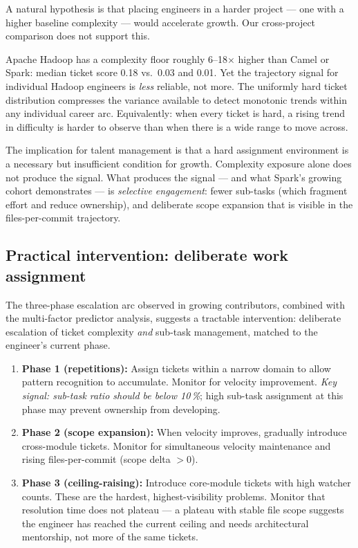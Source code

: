\documentclass[12pt,a4paper]{article}
\begin{document}
A natural hypothesis is that placing engineers in a harder project
--- one with a higher baseline complexity --- would accelerate growth.
Our cross-project comparison does not support this.

Apache Hadoop has a complexity floor roughly 6--18$\times$ higher
than Camel or Spark: median ticket score 0.18 vs.\ 0.03 and 0.01.
Yet the trajectory signal for individual Hadoop engineers is
\textit{less} reliable, not more.
The uniformly hard ticket distribution compresses the variance available
to detect monotonic trends within any individual career arc.
Equivalently: when every ticket is hard, a rising trend in difficulty
is harder to observe than when there is a wide range to move across.

The implication for talent management is that a hard assignment
environment is a necessary but insufficient condition for growth.
Complexity exposure alone does not produce the signal.
What produces the signal --- and what Spark's growing cohort
demonstrates --- is \textit{selective engagement}: fewer sub-tasks
(which fragment effort and reduce ownership), and deliberate scope
expansion that is visible in the files-per-commit trajectory.

\subsection{Practical intervention: deliberate work assignment}

The three-phase escalation arc observed in growing contributors,
combined with the multi-factor predictor analysis, suggests a
tractable intervention: deliberate escalation of ticket complexity
\textit{and} sub-task management, matched to the engineer's current phase.

\begin{enumerate}
  \item \textbf{Phase 1 (repetitions):} Assign tickets within a
    narrow domain to allow pattern recognition to accumulate.
    Monitor for velocity improvement.
    \textit{Key signal: sub-task ratio should be below 10\,\%};
    high sub-task assignment at this phase may prevent ownership
    from developing.
  \item \textbf{Phase 2 (scope expansion):} When velocity improves,
    gradually introduce cross-module tickets.
    Monitor for simultaneous velocity maintenance and
    rising files-per-commit (scope delta $> 0$).
  \item \textbf{Phase 3 (ceiling-raising):} Introduce core-module
    tickets with high watcher counts.
    These are the hardest, highest-visibility problems.
    Monitor that resolution time does not plateau --- a plateau
    with stable file scope suggests the engineer has reached the
    current ceiling and needs architectural mentorship, not
    more of the same tickets.
\end{enumerate}
\end{document}
